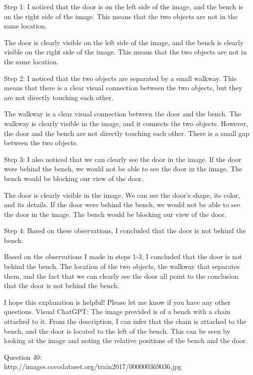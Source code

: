 \begin{enumerate}
        Step 1: I noticed that the door is on the left side of the image, and the bench is on the right side of the image. This means that the two objects are not in the same location.
        
        The door is clearly visible on the left side of the image, and the bench is clearly visible on the right side of the image. This means that the two objects are not in the same location.
        
        Step 2: I noticed that the two objects are separated by a small walkway. This means that there is a clear visual connection between the two objects, but they are not directly touching each other.
        
        The walkway is a clear visual connection between the door and the bench. The walkway is clearly visible in the image, and it connects the two objects. However, the door and the bench are not directly touching each other. There is a small gap between the two objects.
        
        Step 3: I also noticed that we can clearly see the door in the image. If the door were behind the bench, we would not be able to see the door in the image. The bench would be blocking our view of the door.
        
        The door is clearly visible in the image. We can see the door's shape, its color, and its details. If the door were behind the bench, we would not be able to see the door in the image. The bench would be blocking our view of the door.
        
        Step 4: Based on these observations, I concluded that the door is not behind the bench.
        
        Based on the observations I made in steps 1-3, I concluded that the door is not behind the bench. The location of the two objects, the walkway that separates them, and the fact that we can clearly see the door all point to the conclusion that the door is not behind the bench.
        
        I hope this explanation is helpful! Please let me know if you have any other questions.
        \subitem Visual ChatGPT: The image provided is of a bench with a chain attached to it. From the description, I can infer that the chain is attached to the bench, and the door is located to the left of the bench. This can be seen by looking at the image and noting the relative positions of the bench and the door.
    \end{enumerate}
    Question 40:\\http://images.cocodataset.org/train2017/000000369036.jpg
